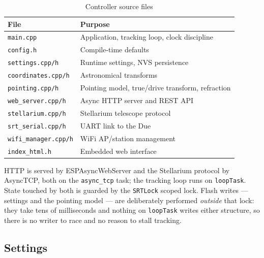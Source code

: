 \documentclass[11pt,a4paper]{article}
\begin{document}
\begin{table}[H]
\centering
\caption{Controller source files}
\begin{tabular}{ll}
\toprule
\textbf{File} & \textbf{Purpose} \\
\midrule
\texttt{main.cpp} & Application, tracking loop, clock discipline \\
\texttt{config.h} & Compile-time defaults \\
\texttt{settings.cpp/h} & Runtime settings, NVS persistence \\
\texttt{coordinates.cpp/h} & Astronomical transforms \\
\texttt{pointing.cpp/h} & Pointing model, true/drive transform, refraction \\
\texttt{web\_server.cpp/h} & Async HTTP server and REST API \\
\texttt{stellarium.cpp/h} & Stellarium telescope protocol \\
\texttt{srt\_serial.cpp/h} & UART link to the Due \\
\texttt{wifi\_manager.cpp/h} & WiFi AP/station management \\
\texttt{index\_html.h} & Embedded web interface \\
\bottomrule
\end{tabular}
\end{table}

HTTP is served by ESPAsyncWebServer and the Stellarium protocol by AsyncTCP, both on the \texttt{async\_tcp} task; the tracking loop runs on \texttt{loopTask}. State touched by both is guarded by the \texttt{SRTLock} scoped lock. Flash writes --- settings and the pointing model --- are deliberately performed \emph{outside} that lock: they take tens of milliseconds and nothing on \texttt{loopTask} writes either structure, so there is no writer to race and no reason to stall tracking.

\subsection{Settings}
\end{document}
